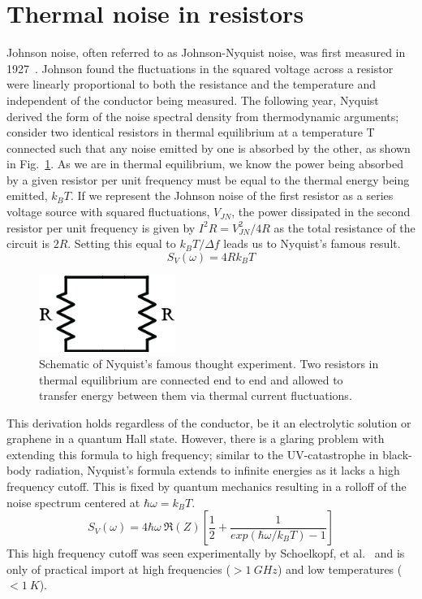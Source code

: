 \section{Thermal noise in resistors}
Johnson noise, often referred to as Johnson-Nyquist noise, was first measured in 1927~\cite{johnson_thermal_1927}. Johnson found the fluctuations in the squared voltage across a resistor were linearly proportional to both the resistance and the temperature and independent of the conductor being measured. The following year, Nyquist derived the form of the noise spectral density from thermodynamic arguments; consider two identical resistors in thermal equilibrium at a temperature T connected such that any noise emitted by one is absorbed by the other, as shown in Fig.~\ref{fig:Nyquist_resistors}. As we are in thermal equilibrium, we know the power being absorbed by a given resistor per unit frequency must be equal to the thermal energy being emitted, $k_BT$. If we represent the Johnson noise of the first resistor as a series voltage source with squared fluctuations, $V_{JN}$, the power dissipated in the second resistor per unit frequency is given by $I^2R = V_{JN}^2 / 4R$ as the total resistance of the circuit is $2R$. Setting this equal to $k_BT / \Delta f$ leads us to Nyquist's famous result.
\begin{equation}\label{eq:Nyquist}
S_{V}(\omega) = 4Rk_BT
\end{equation}
\begin{figure}
\centering
\includegraphics[height = 25mm]{figures/Johnson_noise_thermometry/Nyquist_resistors.png}
\caption{Schematic of Nyquist's famous thought experiment. Two resistors in thermal equilibrium are connected end to end and allowed to transfer energy between them via thermal current fluctuations.}
\label{fig:Nyquist_resistors}
\end{figure}
This derivation holds regardless of the conductor, be it an electrolytic solution or graphene in a quantum Hall state. However, there is a glaring problem with extending this formula to high frequency; similar to the UV-catastrophe in black-body radiation, Nyquist's formula extends to infinite energies as it lacks a high frequency cutoff. This is fixed by quantum mechanics resulting in a rolloff of the noise spectrum centered at $\hbar\omega = k_BT$.
\begin{equation}\label{eq:NyquistFull}
S_V(\omega) = 4\hbar\omega~\Re(Z)\left[\frac{1}{2}+\frac{1}{exp(\hbar\omega/k_BT)-1}\right]
\end{equation}
This high frequency cutoff was seen experimentally by Schoelkopf, et al.~\cite{schoelkopf_frequency_1997} and is only of practical import at high frequencies ($>1~GHz$) and low temperatures ($<1~K$).

